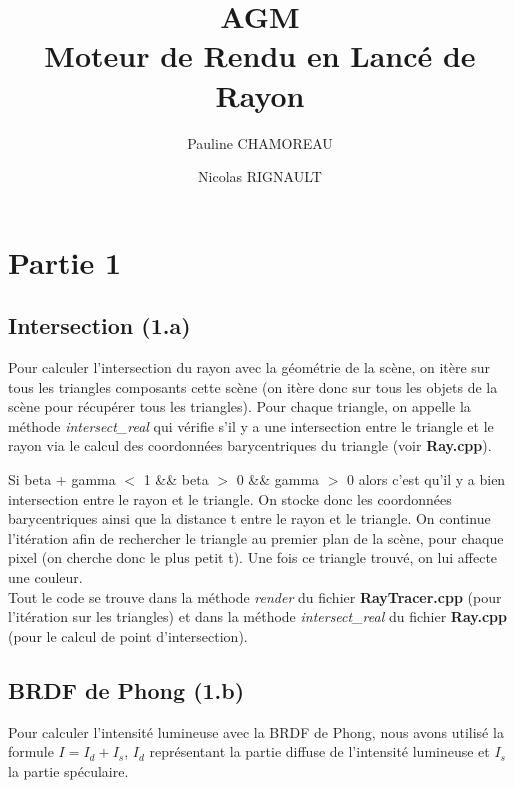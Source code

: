 \documentclass[a4paper,11pt,titlepage]{article}
\title{AGM\\Moteur de Rendu en Lancé de Rayon}
\author{Pauline CHAMOREAU \and Nicolas RIGNAULT}
\begin{document}
\maketitle

\newpage
\section{Partie 1}

\subsection{Intersection (1.a)}

Pour calculer l'intersection du rayon avec la géométrie de la scène, on itère sur tous les triangles composants cette scène (on itère donc sur tous les objets de la scène pour récupérer tous les triangles). Pour chaque triangle, on appelle la méthode \textit{intersect\_real} qui vérifie s'il y a une intersection entre le triangle et le rayon via le calcul des coordonnées barycentriques du triangle (voir \textbf{Ray.cpp}).

Si beta + gamma $<$ 1 \&\& beta $>$ 0 \&\& gamma $>$ 0 alors c'est qu'il y a bien intersection entre le rayon et le triangle. On stocke donc les coordonnées barycentriques ainsi que la distance t entre le rayon et le triangle. On continue l'itération afin de rechercher le triangle au premier plan de la scène, pour chaque pixel (on cherche donc le plus petit t). Une fois ce triangle trouvé, on lui affecte une couleur.\\

Tout le code se trouve dans la méthode \textit{render} du fichier \textbf{RayTracer.cpp} (pour l'itération sur les triangles) et dans la méthode \textit{intersect\_real} du fichier \textbf{Ray.cpp} (pour le calcul de point d'intersection).

\subsection{BRDF de Phong (1.b)}

Pour calculer l'intensité lumineuse avec la BRDF de Phong, nous avons utilisé la formule $I = I_d + I_s$, $I_d$ représentant la partie diffuse de l'intensité lumineuse et $I_s$ la partie spéculaire. \\
\end{document}
